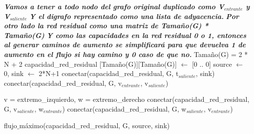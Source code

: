 \begin{algorithmic}
	\State \textit{\textbf{Vamos a tener a todo nodo del grafo original duplicado como V$_{entrante}$ y V$_{saliente}$}}
	\State \textit{\textbf{Y el digrafo representado como una lista de adyacencia.}}
	\State \textit{\textbf{Por otro lado la red residual como una matriz de Tamaño(G) * Tamaño(G)}}
	\State \textit{\textbf{Y como las capacidades en la red residual 0 o 1, entonces al generar caminos de aumento se simplificará para que devuelva 1 de aumento en el flujo si hay camino y 0 caso de que no.}}
	\State Tamaño(G) = 2 * N + 2
	\State capacidad_red_residual [Tamaño(G)][Tamaño(G)] $\leftarrow$ [0 .. 0] 
	\State source $\leftarrow$ 0, sink $\leftarrow$ 2*N+1
			\State conectar(capacidad_red_residual, G, t$_{saliente}$, sink) 
		\EndIf
	\EndFor
		\State conectar(capacidad_red_residual, G, v$_{entrante}$, v$_{saliente}$)
	\EndFor

		\State v = extremo_izquierdo, w = extremo_derecho
		\State conectar(capacidad_red_residual, G, v$_{saliente}$, w$_{entrante}$)
		\State conectar(capacidad_red_residual, G, w$_{saliente}$, v$_{entrante}$)
	\EndFor
	
	\Return flujo$\_$máximo(capacidad_red_residual, G, source, sink)

\EndFunction

\end{algorithmic}


